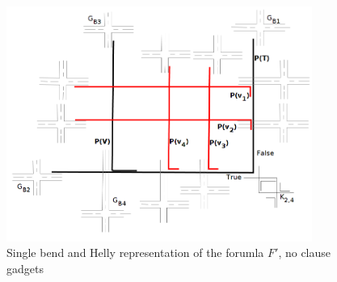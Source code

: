 \begin{figure}[htb]	
\center%
\includegraphics[width=10cm]{./img/gradeb1epghellySBPO.png}
\caption{Single bend and Helly representation of the forumla $F'$, no clause gadgets}
\label{fig:gradeb1epg}
\end{figure}